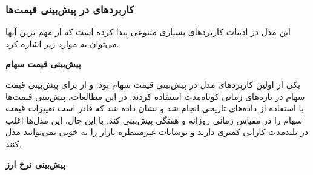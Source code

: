 \subsubsection{کاربردهای  در پیش‌بینی قیمت‌ها}
این مدل در ادبیات کاربرد‌های بسیاری متنوعی پیدا کرده است که از مهم ترین آنها می‌توان به موارد زیر اشاره کرد.

\textbf{پیش‌بینی قیمت سهام}


یکی از اولین کاربردهای مدل  در پیش‌بینی قیمت سهام بود. \cite{box1976time} و \cite{weigend1991predicting} از  برای پیش‌بینی قیمت سهام در بازه‌های زمانی کوتاه‌مدت استفاده کردند. در این مطالعات، پیش‌بینی قیمت‌ها با استفاده از داده‌های تاریخی انجام شد و نشان داده شد که  قادر است تغییرات قیمت سهام را در مقیاس زمانی روزانه و هفتگی پیش‌بینی کند. با این حال، این مدل‌ها اغلب در بلندمدت کارایی کمتری دارند و نوسانات غیرمنتظره بازار را به خوبی نمی‌توانند مدل کنند.

\textbf{پیش‌بینی نرخ ارز}


